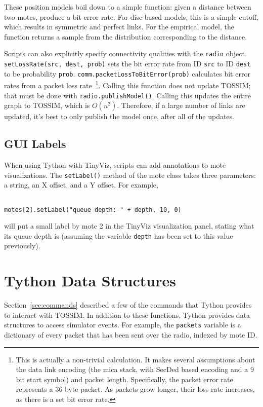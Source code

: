 \documentclass[10pt]{article}
\newcommand{\name}{{Tython}\xspace}
\begin{document}
These position models boil down to a simple function: given a distance
between two motes, produce a bit error rate. For disc-based models,
this is a simple cutoff, which results in symmetric and perfect links. For
the empirical model, the function returns a sample from the
distribution corresponding to the distance.

Scripts can also explicitly specify connectivity qualities with the
{\tt radio} object. {\tt setLossRate(src, dest, prob)} sets
the bit error rate from ID {\tt src} to ID {\tt dest} to be 
probability {\tt prob}. {\tt comm.packetLossToBitError(prob)}  calculates 
bit error rates from a packet loss rate~\footnote{This is actually a 
non-trivial calculation. It makes several assumptions about the data link 
encoding (the mica stack, with SecDed based encoding and a 9 bit start
symbol) and packet length. Specifically, the packet error rate represents
a 36-byte packet. As packets grow longer, their loss rate increases,
as there is a set bit error rate.}. Calling this function does not update
TOSSIM; that must be done with {\tt radio.publishModel()}. Calling
this updates the entire graph to TOSSIM, which is $O(n^{2})$. Therefore,
if a large number of links are updated, it's best to only publish
the model once, after all of the updates.

\subsection{GUI Labels}

When using \name with TinyViz, scripts can add annotations to 
mote visualizations. The {\tt setLabel()} method of the mote class
takes three parameters: a string, an X offset, and a Y offset.
For example,

\begin{verbatim}

motes[2].setLabel("queue depth: " + depth, 10, 0)

\end{verbatim}

will put a small label by mote 2 in the TinyViz visualization panel,
stating what its queue depth is (assuming the variable {\tt depth} has
been set to this value previously).

\section{\name Data Structures}

Section~\ref{sec:commands} described a few of the commands that
\name provides to interact with TOSSIM. In addition to these functions,
\name provides data structures to access simulator events. For
example, the {\tt packets} variable is a dictionary of every packet
that has been sent over the radio, indexed by mote ID.
\end{document}
